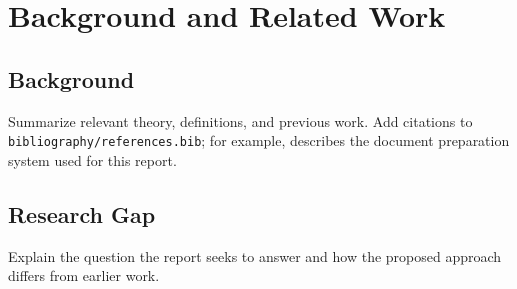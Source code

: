 \chapter{Background and Related Work}
\label{ch:background}

\section{Background}

Summarize relevant theory, definitions, and previous work. Add citations to
\texttt{bibliography/references.bib}; for example, \citet{lamport1994latex} describes the
document preparation system used for this report.

\section{Research Gap}

Explain the question the report seeks to answer and how the proposed approach
differs from earlier work.
